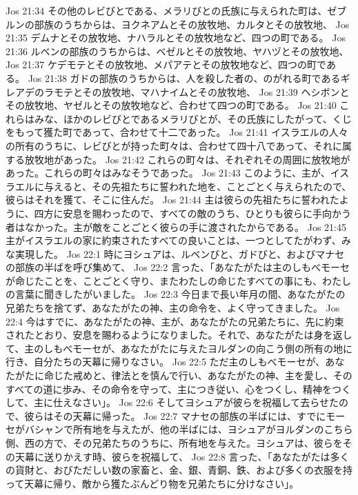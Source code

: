 Jos 21:34  その他のレビびとである、メラリびとの氏族に与えられた町は、ゼブルンの部族のうちからは、ヨクネアムとその放牧地、カルタとその放牧地、
Jos 21:35  デムナとその放牧地、ナハラルとその放牧地など、四つの町である。
Jos 21:36  ルベンの部族のうちからは、ベゼルとその放牧地、ヤハヅとその放牧地、
Jos 21:37  ケデモテとその放牧地、メパアテとその放牧地など、四つの町である。
Jos 21:38  ガドの部族のうちからは、人を殺した者の、のがれる町であるギレアデのラモテとその放牧地、マハナイムとその放牧地、
Jos 21:39  ヘシボンとその放牧地、ヤゼルとその放牧地など、合わせて四つの町である。
Jos 21:40  これらはみな、ほかのレビびとであるメラリびとが、その氏族にしたがって、くじをもって獲た町であって、合わせて十二であった。
Jos 21:41  イスラエルの人々の所有のうちに、レビびとが持った町々は、合わせて四十八であって、それに属する放牧地があった。
Jos 21:42  これらの町々は、それぞれその周囲に放牧地があった。これらの町々はみなそうであった。
Jos 21:43  このように、主が、イスラエルに与えると、その先祖たちに誓われた地を、ことごとく与えられたので、彼らはそれを獲て、そこに住んだ。
Jos 21:44  主は彼らの先祖たちに誓われたように、四方に安息を賜わったので、すべての敵のうち、ひとりも彼らに手向かう者はなかった。主が敵をことごとく彼らの手に渡されたからである。
Jos 21:45  主がイスラエルの家に約束されたすべての良いことは、一つとしてたがわず、みな実現した。
Jos 22:1  時にヨシュアは、ルベンびと、ガドびと、およびマナセの部族の半ばを呼び集めて、
Jos 22:2  言った、「あなたがたは主のしもべモーセが命じたことを、ことごとく守り、またわたしの命じたすべての事にも、わたしの言葉に聞きしたがいました。
Jos 22:3  今日まで長い年月の間、あなたがたの兄弟たちを捨てず、あなたがたの神、主の命令を、よく守ってきました。
Jos 22:4  今はすでに、あなたがたの神、主が、あなたがたの兄弟たちに、先に約束されたとおり、安息を賜わるようになりました。それで、あなたがたは身を返して、主のしもべモーセが、あなたがたに与えたヨルダンの向こう側の所有の地に行き、自分たちの天幕に帰りなさい。
Jos 22:5  ただ主のしもべモーセが、あなたがたに命じた戒めと、律法とを慎んで行い、あなたがたの神、主を愛し、そのすべての道に歩み、その命令を守って、主につき従い、心をつくし、精神をつくして、主に仕えなさい」。
Jos 22:6  そしてヨシュアが彼らを祝福して去らせたので、彼らはその天幕に帰った。
Jos 22:7  マナセの部族の半ばには、すでにモーセがバシャンで所有地を与えたが、他の半ばには、ヨシュアがヨルダンのこちら側、西の方で、その兄弟たちのうちに、所有地を与えた。ヨシュアは、彼らをその天幕に送りかえす時、彼らを祝福して、
Jos 22:8  言った、「あなたがたは多くの貨財と、おびただしい数の家畜と、金、銀、青銅、鉄、および多くの衣服を持って天幕に帰り、敵から獲たぶんどり物を兄弟たちに分けなさい」。
